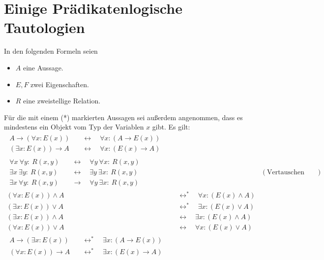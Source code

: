 \section{Einige Prädikatenlogische Tautologien}
In den folgenden Formeln seien
\begin{itemize}
    \item $A$ eine Aussage.
    \item $E,F$ zwei Eigenschaften.
    \item $R$ eine zweistellige Relation.
\end{itemize}
Für die mit einem (*) markierten Aussagen sei außerdem angenommen, dass es mindestens ein Objekt vom Typ der Variablen $x$ gibt. Es gilt:
\begingroup
\allowdisplaybreaks
\begin{align*}
    \begin{split}
        A \to (\forall x : E(x)) & \quad\leftrightarrow\quad \forall x : (A \to E(x)) \\
        (\exists x : E(x)) \to A & \quad\leftrightarrow\quad \forall x : (E(x) \to A)
    \end{split} \\[1em]
    \begin{split}
        \forall x\ \forall y:\ R(x,y) & \quad\leftrightarrow\quad \forall y\ \forall x:\ R(x,y) \\
        \exists x\ \exists y:\ R(x,y) & \quad\leftrightarrow\quad \exists y\ \exists x:\ R(x,y) \\
        \exists x\ \forall y:\ R(x,y) & \quad\to\quad \forall y\ \exists x:\ R(x,y)
    \end{split} && (\text{Vertauschen von Quantoren}) \\[1em]
    (\forall x : E(x)) \land A &  \quad\leftrightarrow^*\quad  \forall x :(E(x) \land A) \\
    (\exists x : E(x)) \lor A &  \quad\leftrightarrow^*\quad  \exists x : (E(x) \lor A) \\
    (\exists x : E(x)) \land A &  \quad\leftrightarrow\quad  \exists x : (E(x) \land A) \\
    (\forall x : E(x)) \lor A &  \quad\leftrightarrow\quad  \forall x :(E(x) \lor A) \\[1em] %
    \begin{split}
        A \to( \exists x : E(x)) & \quad\leftrightarrow^*\quad \exists x : ( A\to E(x)) \\ %
        (\forall x : E(x)) \to A & \quad\leftrightarrow^*\quad \exists x : (E(x) \to A) %

\end{split}
\end{align*}
